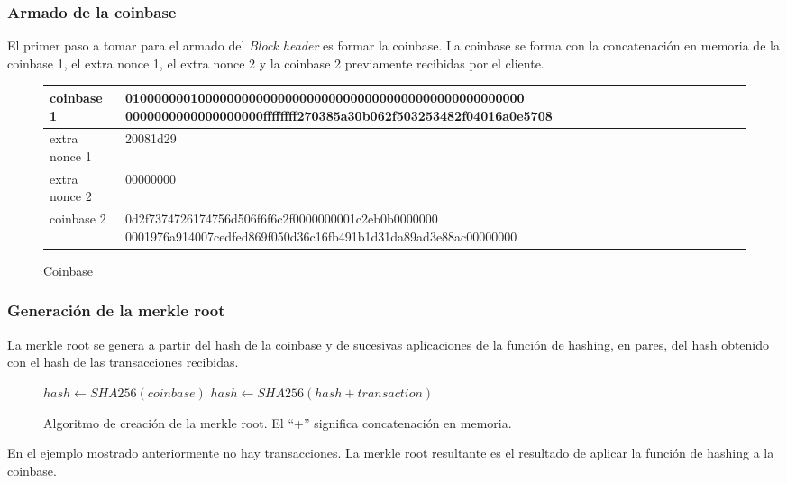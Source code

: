 \documentclass[a4paper, 10pt, twoside]{article}
\begin{document}
\subsubsection{Armado de la coinbase}

El primer paso a tomar para el armado del \textit{Block header} es formar la coinbase.
 La coinbase se forma con la concatenación en memoria de la coinbase 1, el extra nonce 1, el extra nonce 2 y 
la coinbase 2 previamente recibidas por el cliente.

\begin{figure}[H]
  \centering
  \begin{tabular}{ | l | p{11cm} | }
    \hline
    coinbase 1 & 0100000001000000000000000000000000000000000000000000000 \newline
    0000000000000000000ffffffff270385a30b062f503253482f04016a0e5708 \\ \hline
    extra nonce 1 & 20081d29 \\ \hline
    extra nonce 2 & 00000000 \\ \hline
    coinbase 2 & 0d2f7374726174756d506f6f6c2f0000000001c2eb0b0000000 \newline
		0001976a914007cedfed869f050d36c16fb491b1d31da89ad3e88ac00000000 \\ \hline
  \end{tabular}
  \caption{Coinbase}
\end{figure}

\subsubsection{Generación de la merkle root} \label{merkle_root}

La merkle root se genera a partir del hash de la coinbase y de sucesivas aplicaciones de la función de hashing,  
en pares, del hash obtenido con el hash de las transacciones recibidas.

\begin{figure}[H]
	\begin{algorithmic}
	\State $hash \gets SHA256(coinbase)$
		\State $hash \gets SHA256(hash + transaction)$
	\EndFor
	\end{algorithmic}
	\caption{Algoritmo de creación de la merkle root. El ``+'' significa concatenación en memoria.}
\end{figure}

En el ejemplo mostrado anteriormente no hay transacciones. La merkle root resultante es el resultado de aplicar 
la función de hashing a la coinbase.
\end{document}

